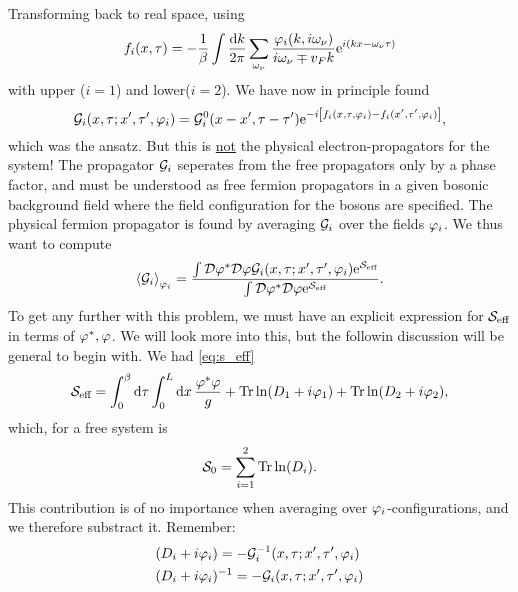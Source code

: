 Transforming back to real space, using
\begin{equation}
f_i(x,\tau) = -\frac{1}{\beta}\int\frac{\dd k}{2\pi}\sum_{\omega_\nu}\frac{\varphi_i(k,i\omega_\nu)}{i\omega_\nu \mp v_Fk}\mathrm{e}^{i(kx-\omega_\nu\tau)}
\end{equation}
with upper ($i=1$) and lower($i=2$). We have now in principle found
\begin{equation}
	\mathcal{G}_i(x,\tau;x',\tau',\varphi_i) = \mathcal{G}_i^0(x-x',\tau-\tau')\mathrm{e}^{-i\left[f_i(x,\tau,\varphi_i)-f_i(x',\tau',\varphi_i)\right]},
\end{equation}
which was the ansatz. But this is \underline{not} the physical electron-propagators for the system! 
The propagator \(\mathcal{G}_i\) seperates from the free propagators only by a phase factor, and must be understood as free fermion propagators in a given bosonic background field where the field configuration for the bosons are specified.
The physical fermion propagator is found by averaging $\mathcal{G}_i$ over the fields $\varphi_i$. 
We thus want to compute
\begin{equation}
\ev{\gre_i}_{\p_i} = \frac{\int\D\p^*\D\p\gre_i(x, \tau;x', \tau', \p_i)\e^{\Sa_{\text{eff}}}}{\int\D\p^*\D\p\e^{\Sa_{\text{eff}}}}.
\end{equation}
To get any further with this problem, we must have an explicit expression for $\mathcal{S}_{\text{eff}}$ in terms of $\varphi^*,\varphi$. We will look more into this, but the followin discussion will be general to begin with. We had \cref{eq:s_eff}
\begin{equation*}
\mathcal{S}_{\text{eff}} = \int_{0}^{\beta}\dd\tau\int_{0}^{L}\dd{x}\frac{\varphi^*\varphi}{g} + \Tr\ln(D_1+i\varphi_1) + \Tr\ln(D_2 +i\varphi_2),
\end{equation*}
which, for a free system is
\begin{equation}
\mathcal{S}_0 =\sum_{i=1}^2\Tr\ln(D_i).
\end{equation}
This contribution is of no importance when averaging over $\varphi_i$-configurations, and we therefore substract it.
Remember:
\begin{align*}
	(D_i + i\varphi_i) &= -\mathcal{G}_i^{-1}(x,\tau;x',\tau',\varphi_i) \\
	(D_i + i\varphi_i)&^{-1} = -\mathcal{G}_i(x,\tau;x',\tau',\varphi_i)
\end{align*}

